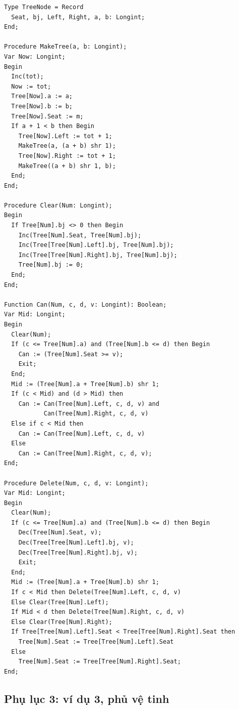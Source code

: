 \documentclass[11pt]{article}
\begin{document}
\begin{verbatim}
Type TreeNode = Record
  Seat, bj, Left, Right, a, b: Longint;
End;

Procedure MakeTree(a, b: Longint);
Var Now: Longint;
Begin
  Inc(tot);
  Now := tot;
  Tree[Now].a := a;
  Tree[Now].b := b;
  Tree[Now].Seat := m;
  If a + 1 < b then Begin
    Tree[Now].Left := tot + 1;
    MakeTree(a, (a + b) shr 1);
    Tree[Now].Right := tot + 1;
    MakeTree((a + b) shr 1, b);
  End;
End;

Procedure Clear(Num: Longint);
Begin
  If Tree[Num].bj <> 0 then Begin
    Inc(Tree[Num].Seat, Tree[Num].bj);
    Inc(Tree[Tree[Num].Left].bj, Tree[Num].bj);
    Inc(Tree[Tree[Num].Right].bj, Tree[Num].bj);
    Tree[Num].bj := 0;
  End;
End;

Function Can(Num, c, d, v: Longint): Boolean;
Var Mid: Longint;
Begin
  Clear(Num);
  If (c <= Tree[Num].a) and (Tree[Num].b <= d) then Begin
    Can := (Tree[Num].Seat >= v);
    Exit;
  End;
  Mid := (Tree[Num].a + Tree[Num].b) shr 1;
  If (c < Mid) and (d > Mid) then
    Can := Can(Tree[Num].Left, c, d, v) and
           Can(Tree[Num].Right, c, d, v)
  Else if c < Mid then
    Can := Can(Tree[Num].Left, c, d, v)
  Else
    Can := Can(Tree[Num].Right, c, d, v);
End;

Procedure Delete(Num, c, d, v: Longint);
Var Mid: Longint;
Begin
  Clear(Num);
  If (c <= Tree[Num].a) and (Tree[Num].b <= d) then Begin
    Dec(Tree[Num].Seat, v);
    Dec(Tree[Tree[Num].Left].bj, v);
    Dec(Tree[Tree[Num].Right].bj, v);
    Exit;
  End;
  Mid := (Tree[Num].a + Tree[Num].b) shr 1;
  If c < Mid then Delete(Tree[Num].Left, c, d, v)
  Else Clear(Tree[Num].Left);
  If Mid < d then Delete(Tree[Num].Right, c, d, v)
  Else Clear(Tree[Num].Right);
  If Tree[Tree[Num].Left].Seat < Tree[Tree[Num].Right].Seat then
    Tree[Num].Seat := Tree[Tree[Num].Left].Seat
  Else
    Tree[Num].Seat := Tree[Tree[Num].Right].Seat;
End;
\end{verbatim}

\subsection*{Phụ lục 3: ví dụ 3, phủ vệ tinh}
\end{document}
